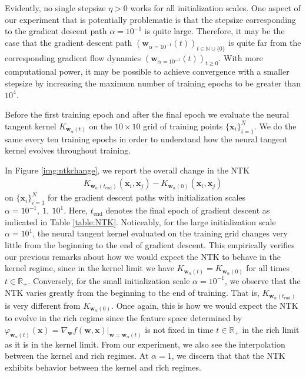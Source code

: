 \documentclass{article}
\begin{document}
Evidently, no single stepsize $\eta > 0$ works for all initialization scales. One aspect of our experiment that is potentially problematic is that the stepsize corresponding to the gradient descent path $\alpha = 10^{-1}$ is quite large. Therefore, it may be the case that the gradient descent path $(\boldsymbol{w}_{\alpha = 10^{-1}}(t))_{t \in \mathbb{N} \cup \{ 0 \}}$ is quite far from the corresponding gradient flow dynamics $(\boldsymbol{w}_{\alpha = 10^{-1}}(t))_{t\geq 0}$. With more computational power, it may be possible to achieve convergence with a smaller stepsize by increasing the maximum number of training epochs to be greater than $10^4$.

Before the first training epoch and after the final epoch we evaluate the neural tangent kernel $K_{\boldsymbol{w}_{\alpha}(t)}$ on the $10 \times 10$ grid of training points $\{ \boldsymbol{x}_i \}_{i=1}^N$. We do the same every ten training epochs in order to understand how the neural tangent kernel evolves throughout training.

In Figure \ref{img:ntkchange}, we report the overall change in the NTK
\begin{align*}
   K_{\boldsymbol{w}_{\alpha}(t_{\text{end}})}(\boldsymbol{x}_i, \boldsymbol{x}_j) -  K_{\boldsymbol{w}_{\alpha}(0)}(\boldsymbol{x}_i, \boldsymbol{x}_j)
\end{align*}
on $\{ \boldsymbol{x}_i \}_{i=1}^N$ for the gradient descent paths with initialization scales $\alpha = 10^{-1}, \ 1, \ 10^1$. Here, $t_{\text{end}}$ denotes the final epoch of gradient descent as indicated in Table \ref{table:NTK}. Noticeably, for the large initialization scale $\alpha = 10^1$, the neural tangent kernel evaluated on the training grid changes very little from the beginning to the end of gradient descent. This empirically verifies our previous remarks about how we would expect the NTK to behave in the kernel regime, since in the kernel limit we have $K_{\boldsymbol{w}_{\alpha}(t)} = K_{\boldsymbol{w}_{\alpha}(0)}$ for all times $t \in \mathbb{R}_+$. Conversely, for the small initialization scale $\alpha = 10^{-1}$, we observe that the NTK varies greatly from the beginning to the end of training. That is, $K_{\boldsymbol{w}_{\alpha}(t_{\text{end}})}$ is very different from $K_{\boldsymbol{w}_{\alpha}(0)}$. Once again, this is how we would expect the NTK to evolve in the rich regime since the feature space determined by $\varphi_{\boldsymbol{w}_{\alpha}(t)}(\boldsymbol{x}) = \nabla_{\boldsymbol{w}}f(\boldsymbol{w}, \boldsymbol{x})|_{\boldsymbol{w} = \boldsymbol{w}_{\alpha}(t)}$ is not fixed in time $t \in \mathbb{R}_+$ in the rich limit as it is in the kernel limit. From our experiment, we also see the interpolation between the kernel and rich regimes. At $\alpha = 1$, we discern that that the NTK exhibits behavior between the kernel and rich regimes.
\end{document}
